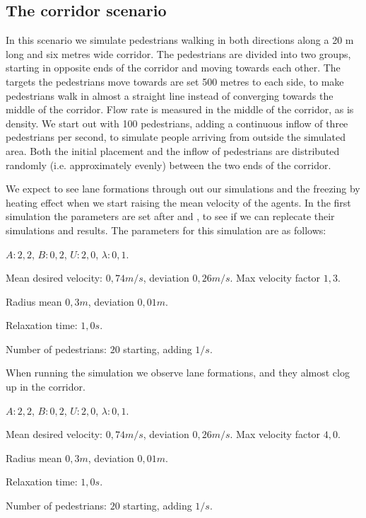 \subsection{The corridor scenario}
In this scenario we simulate pedestrians walking in both directions along a 20 
m long and six metres wide corridor. The pedestrians are divided into two 
groups, starting in opposite ends of the corridor and moving towards each 
other. The targets the pedestrians move towards are set 500 metres to each 
side, to make pedestrians walk in almost a straight line instead of converging 
towards the middle of the corridor. Flow rate is measured in the middle of the 
corridor, as is density. We start out with 100 pedestrians, adding a 
continuous inflow of three pedestrians per second, to simulate people arriving 
from outside the simulated area. Both the initial placement and the inflow of 
pedestrians are distributed randomly (i.e. approximately evenly) between the 
two ends of the corridor.

We expect to see lane formations through out our simulations
and the freezing by heating effect when we start raising the mean velocity
of the agents.
In the first simulation the parameters are set after \cite{ABconstant} and
\cite{self-org}, to see if we can replecate their simulations and results.
The parameters for this simulation are as follows:

\begin{itemize*}
    \item $A: 2,2$, $B: 0,2$, $U: 2,0$, $\lambda: 0,1$.
    \item Mean desired velocity: $0,74 m/s$, deviation $0,26 m/s$. Max 
        velocity factor $1,3$.
    \item Radius mean $0,3 m$, deviation $0,01 m$.
    \item Relaxation time: $1,0 s$.
    \item Number of pedestrians: $20$ starting, adding $1/s$.
\end{itemize*}

When running the simulation we observe lane formations, and they almost clog up
in the corridor.

\begin{itemize*}
    \item $A: 2,2$, $B: 0,2$, $U: 2,0$, $\lambda: 0,1$.
    \item Mean desired velocity: $0,74 m/s$, deviation $0,26 m/s$. Max 
        velocity factor $4,0$.
    \item Radius mean $0,3 m$, deviation $0,01 m$.
    \item Relaxation time: $1,0 s$.
    \item Number of pedestrians: $20$ starting, adding $1/s$.
\end{itemize*}

